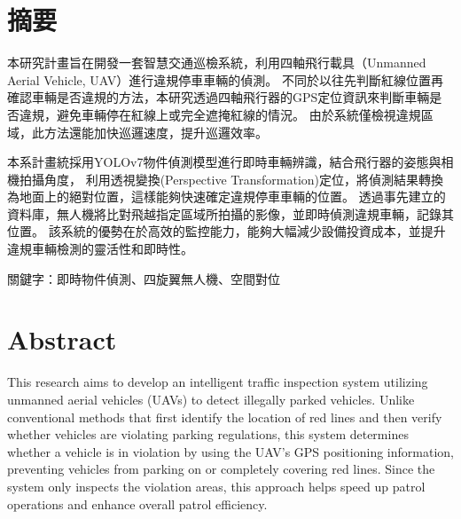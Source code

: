 \documentclass[12pt]{article}       %
\begin{document}
\setcounter{page}{1}  %


\section*{\centering 摘要}  %


\hspace{2em}
本研究計畫旨在開發一套智慧交通巡檢系統，利用四軸飛行載具（Unmanned Aerial Vehicle, UAV）進行違規停車車輛的偵測。
不同於以往先判斷紅線位置再確認車輛是否違規的方法，本研究透過四軸飛行器的GPS定位資訊來判斷車輛是否違規，避免車輛停在紅線上或完全遮掩紅線的情況。
由於系統僅檢視違規區域，此方法還能加快巡邏速度，提升巡邏效率。

本系計畫統採用YOLOv7物件偵測模型進行即時車輛辨識，結合飛行器的姿態與相機拍攝角度，
利用透視變換(Perspective Transformation)定位，將偵測結果轉換為地面上的絕對位置，這樣能夠快速確定違規停車車輛的位置。
透過事先建立的資料庫，無人機將比對飛越指定區域所拍攝的影像，並即時偵測違規車輛，記錄其位置。
該系統的優勢在於高效的監控能力，能夠大幅減少設備投資成本，並提升違規車輛檢測的靈活性和即時性。

\vspace{1.5em}
\noindent 關鍵字：即時物件偵測、四旋翼無人機、空間對位
\newpage  %

\section*{\centering Abstract}  %
\hspace{2em}This research aims to develop an intelligent traffic inspection system utilizing unmanned aerial vehicles (UAVs) to detect illegally parked vehicles.
Unlike conventional methods that first identify the location of red lines and then verify whether vehicles are violating parking regulations, this system determines whether a vehicle is in violation by using the UAV's GPS positioning information, preventing vehicles from parking on or completely covering red lines.
Since the system only inspects the violation areas, this approach helps speed up patrol operations and enhance overall patrol efficiency.
\end{document}
